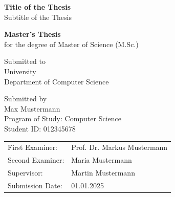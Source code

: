 \begin{titlepage}
  \thispagestyle{empty}


  \vspace{2cm}

  \begin{center}
    {\LARGE \textbf{Title of the Thesis} \\}
    \vspace{0.5cm}
    {\large Subtitle of the Thesis}

    \vspace{1.2cm}
    {\large \textbf{Master's Thesis} \\}
    \vspace{0.2cm}
    for the degree of Master of Science (M.Sc.)

    \vspace{1.2cm}
    Submitted to \\
    University \\
    Department of Computer Science

    \vspace{1.2cm}
    Submitted by \\
    Max Mustermann \\
    Program of Study: Computer Science\\
    Student ID: 012345678
  \end{center}

  \vfill

\begingroup
\renewcommand{\arraystretch}{1.0}
\begin{tabular}{@{}ll@{}}
  First Examiner:  & Prof. Dr. Markus Mustermann \\
  Second Examiner: & Maria Mustermann \\
  Supervisor:    & Martin Mustermann \\
  Submission Date: & 01.01.2025 \\
\end{tabular}
\endgroup

\end{titlepage}
\addtocounter{page}{1}
